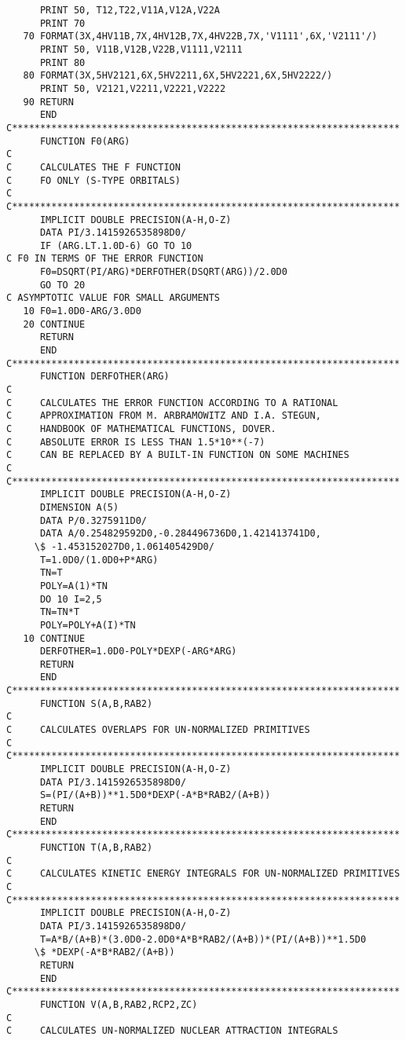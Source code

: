 \begin{verbatim}
      PRINT 50, T12,T22,V11A,V12A,V22A
      PRINT 70
   70 FORMAT(3X,4HV11B,7X,4HV12B,7X,4HV22B,7X,'V1111',6X,'V2111'/)
      PRINT 50, V11B,V12B,V22B,V1111,V2111
      PRINT 80
   80 FORMAT(3X,5HV2121,6X,5HV2211,6X,5HV2221,6X,5HV2222/)
      PRINT 50, V2121,V2211,V2221,V2222
   90 RETURN
      END
C*********************************************************************
      FUNCTION F0(ARG)
C
C     CALCULATES THE F FUNCTION
C     FO ONLY (S-TYPE ORBITALS)
C
C*********************************************************************
      IMPLICIT DOUBLE PRECISION(A-H,O-Z)
      DATA PI/3.1415926535898D0/
      IF (ARG.LT.1.0D-6) GO TO 10
C F0 IN TERMS OF THE ERROR FUNCTION
      F0=DSQRT(PI/ARG)*DERFOTHER(DSQRT(ARG))/2.0D0
      GO TO 20
C ASYMPTOTIC VALUE FOR SMALL ARGUMENTS
   10 F0=1.0D0-ARG/3.0D0
   20 CONTINUE
      RETURN
      END
C*********************************************************************
      FUNCTION DERFOTHER(ARG)
C
C     CALCULATES THE ERROR FUNCTION ACCORDING TO A RATIONAL
C     APPROXIMATION FROM M. ARBRAMOWITZ AND I.A. STEGUN,
C     HANDBOOK OF MATHEMATICAL FUNCTIONS, DOVER.
C     ABSOLUTE ERROR IS LESS THAN 1.5*10**(-7)
C     CAN BE REPLACED BY A BUILT-IN FUNCTION ON SOME MACHINES
C
C*********************************************************************
      IMPLICIT DOUBLE PRECISION(A-H,O-Z)
      DIMENSION A(5)
      DATA P/0.3275911D0/
      DATA A/0.254829592D0,-0.284496736D0,1.421413741D0,
     \$ -1.453152027D0,1.061405429D0/
      T=1.0D0/(1.0D0+P*ARG)
      TN=T
      POLY=A(1)*TN
      DO 10 I=2,5
      TN=TN*T
      POLY=POLY+A(I)*TN
   10 CONTINUE
      DERFOTHER=1.0D0-POLY*DEXP(-ARG*ARG)
      RETURN
      END
C*********************************************************************
      FUNCTION S(A,B,RAB2)
C
C     CALCULATES OVERLAPS FOR UN-NORMALIZED PRIMITIVES
C
C*********************************************************************
      IMPLICIT DOUBLE PRECISION(A-H,O-Z)
      DATA PI/3.1415926535898D0/
      S=(PI/(A+B))**1.5D0*DEXP(-A*B*RAB2/(A+B))
      RETURN
      END
C*********************************************************************
      FUNCTION T(A,B,RAB2)
C
C     CALCULATES KINETIC ENERGY INTEGRALS FOR UN-NORMALIZED PRIMITIVES
C
C*********************************************************************
      IMPLICIT DOUBLE PRECISION(A-H,O-Z)
      DATA PI/3.1415926535898D0/
      T=A*B/(A+B)*(3.0D0-2.0D0*A*B*RAB2/(A+B))*(PI/(A+B))**1.5D0
     \$ *DEXP(-A*B*RAB2/(A+B))
      RETURN
      END
C*********************************************************************
      FUNCTION V(A,B,RAB2,RCP2,ZC)
C
C     CALCULATES UN-NORMALIZED NUCLEAR ATTRACTION INTEGRALS

\end{verbatim}
